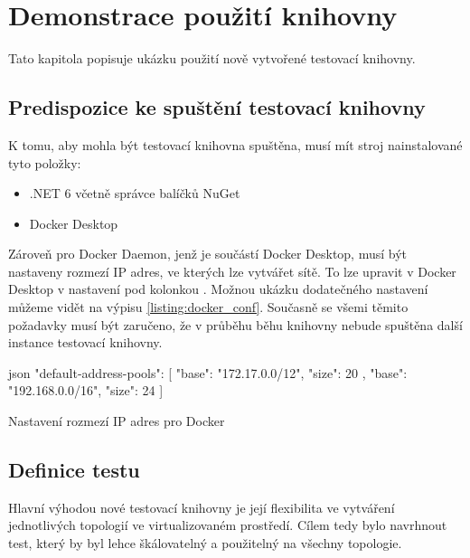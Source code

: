 \chapter{Demonstrace použití knihovny}\label{chap:demonstration}

Tato kapitola popisuje ukázku použití nově vytvořené testovací knihovny.


\section{Predispozice ke spuštění testovací knihovny}\label{sec:test_requirements}

K tomu, aby mohla být testovací knihovna spuštěna, musí mít stroj nainstalované tyto položky:

\begin{itemize}
    \item .NET 6 včetně správce balíčků NuGet
    \item Docker Desktop
\end{itemize}

Zároveň pro Docker Daemon, jenž je součástí Docker Desktop, musí být nastaveny rozmezí IP adres, ve kterých lze vytvářet sítě. To lze upravit v Docker Desktop v nastavení pod kolonkou . Možnou ukázku dodatečného nastavení můžeme vidět na výpisu \ref{listing:docker_conf}. Současně se všemi těmito požadavky musí být zaručeno, že v průběhu běhu knihovny nebude spuštěna další instance testovací knihovny.

\begin{listing}[htbp]
    \centering
    \begin{cminted}{json}
"default-address-pools": [
    {
      "base": "172.17.0.0/12",
      "size": 20
    },
    {
      "base": "192.168.0.0/16",
      "size": 24
    }
]
    \end{cminted}
\caption{Nastavení rozmezí IP adres pro Docker}
\label{listing:docker_conf}
\end{listing}


\section{Definice testu}\label{sec:modbus_test}

Hlavní výhodou nové testovací knihovny je její flexibilita ve vytváření jednotlivých topologií ve virtualizovaném prostředí. Cílem tedy bylo navrhnout test, který by byl lehce škálovatelný a použitelný na všechny topologie. 

